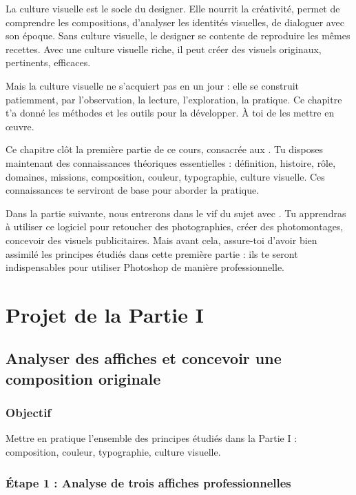 La culture visuelle est le socle du designer. Elle nourrit la créativité, permet de comprendre les compositions, d'analyser les identités visuelles, de dialoguer avec son époque. Sans culture visuelle, le designer se contente de reproduire les mêmes recettes. Avec une culture visuelle riche, il peut créer des visuels originaux, pertinents, efficaces.

Mais la culture visuelle ne s'acquiert pas en un jour : elle se construit patiemment, par l'observation, la lecture, l'exploration, la pratique. Ce chapitre t'a donné les méthodes et les outils pour la développer. À toi de les mettre en œuvre.

Ce chapitre clôt la première partie de ce cours, consacrée aux . Tu disposes maintenant des connaissances théoriques essentielles : définition, histoire, rôle, domaines, missions, composition, couleur, typographie, culture visuelle. Ces connaissances te serviront de base pour aborder la pratique.

Dans la partie suivante, nous entrerons dans le vif du sujet avec . Tu apprendras à utiliser ce logiciel pour retoucher des photographies, créer des photomontages, concevoir des visuels publicitaires. Mais avant cela, assure-toi d'avoir bien assimilé les principes étudiés dans cette première partie : ils te seront indispensables pour utiliser Photoshop de manière professionnelle.

\section*{Projet de la Partie I}

\subsection*{Analyser des affiches et concevoir une composition originale}

\subsubsection*{Objectif}

Mettre en pratique l'ensemble des principes étudiés dans la Partie I : composition, couleur, typographie, culture visuelle.

\subsubsection*{Étape 1 : Analyse de trois affiches professionnelles}

